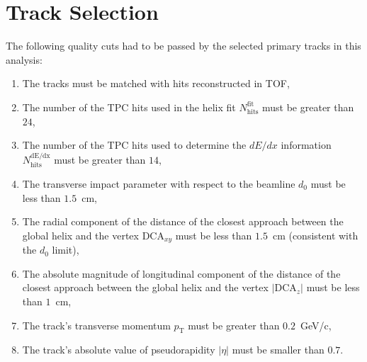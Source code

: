 \section{Track Selection}\label{section:star_track_selection}
The following quality cuts had to be passed by the selected primary tracks in this analysis:
\begin{enumerate}
	\item The tracks must be matched with hits reconstructed in TOF,
	\item The number of the  TPC hits used in the helix fit $N_{\textrm{hits}}^{\textrm{fit}}$ must be greater than $24$,
	\item The number of the  TPC hits used to determine the $dE/dx$ information $N_{\textrm{hits}}^{\textrm{dE/dx}}$ must be greater than $14$,
	\item The transverse impact parameter with respect to the beamline $d_0$ must be less than $1.5$~cm,
	\item The radial component of the distance of the closest approach between  the global helix and the vertex $\textrm{DCA}_{xy}$ must be less than $1.5$~cm (consistent with the $d_0$ limit),
	\item The absolute magnitude of  longitudinal component of the distance of the closest approach between  the global helix and the vertex $|\textrm{DCA}_{z}|$ must be less than $1$~cm,
	\item The track's transverse momentum $p_\textrm{T}$ must be greater than $0.2$~GeV/c,
	\item The track's absolute value of  pseudorapidity $|\eta|$ must be smaller than $0.7$.
\end{enumerate}

